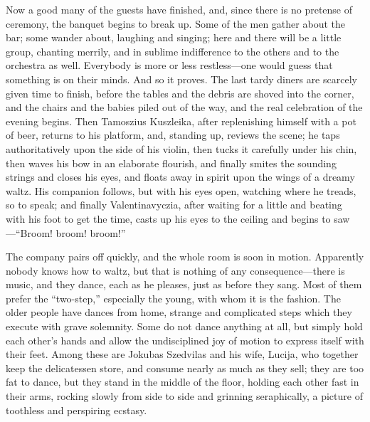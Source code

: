\documentclass[
]{book}
\theoremstyle{definition}
\theoremstyle{definition}
\theoremstyle{definition}
\theoremstyle{definition}
\theoremstyle{remark}
\begin{document}
Now a good many of the guests have finished, and, since there is no pretense of ceremony, the banquet begins to break up. Some of the men gather about the bar; some wander about, laughing and singing; here and there will be a little group, chanting merrily, and in sublime indifference to the others and to the orchestra as well. Everybody is more or less restless---one would guess that something is on their minds. And so it proves. The last tardy diners are scarcely given time to finish, before the tables and the debris are shoved into the corner, and the chairs and the babies piled out of the way, and the real celebration of the evening begins. Then Tamoszius Kuszleika, after replenishing himself with a pot of beer, returns to his platform, and, standing up, reviews the scene; he taps authoritatively upon the side of his violin, then tucks it carefully under his chin, then waves his bow in an elaborate flourish, and finally smites the sounding strings and closes his eyes, and floats away in spirit upon the wings of a dreamy waltz. His companion follows, but with his eyes open, watching where he treads, so to speak; and finally Valentinavyczia, after waiting for a little and beating with his foot to get the time, casts up his eyes to the ceiling and begins to saw---``Broom! broom! broom!''

The company pairs off quickly, and the whole room is soon in motion. Apparently nobody knows how to waltz, but that is nothing of any consequence---there is music, and they dance, each as he pleases, just as before they sang. Most of them prefer the ``two-step,'' especially the young, with whom it is the fashion. The older people have dances from home, strange and complicated steps which they execute with grave solemnity. Some do not dance anything at all, but simply hold each other's hands and allow the undisciplined joy of motion to express itself with their feet. Among these are Jokubas Szedvilas and his wife, Lucija, who together keep the delicatessen store, and consume nearly as much as they sell; they are too fat to dance, but they stand in the middle of the floor, holding each other fast in their arms, rocking slowly from side to side and grinning seraphically, a picture of toothless and perspiring ecstasy.
\end{document}
